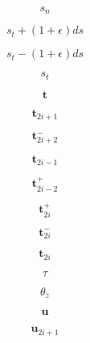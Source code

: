 \documentclass[a4paper,10pt,fleqn]{book}
\newcommand{\vect}[1]{\boldsymbol{#1}}
\begin{document}
\begin{equation}
s_{n}
\end{equation}


\begin{equation}
s_t + (1+\epsilon)ds
\end{equation}


\begin{equation}
s_t - (1+\epsilon)ds
\end{equation}


\begin{equation}
s_t
\end{equation}


\begin{equation}
\vect{t}
\end{equation}


\begin{equation}
\vect{t}_{2i+1}
\end{equation}


\begin{equation}
\vect{t}_{2i+2}^-
\end{equation}


\begin{equation}
\vect{t}_{2i-1}
\end{equation}


\begin{equation}
\vect{t}_{2i-2}^+
\end{equation}


\begin{equation}
\vect{t}_{2i}^+
\end{equation}


\begin{equation}
\vect{t}_{2i}^-
\end{equation}


\begin{equation}
\vect{t}_{2i}
\end{equation}


\begin{equation}
\tau
\end{equation}


\begin{equation}
\theta_z
\end{equation}


\begin{equation}
\vect{u}
\end{equation}


\begin{equation}
\vect{u}_{2i+1}
\end{equation}
\end{document}
